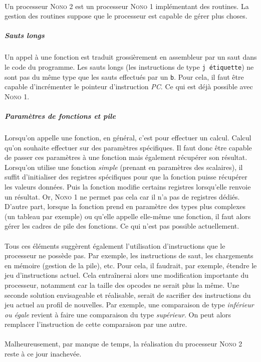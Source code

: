 \paragraph{}{
	Un processeur \textsc{Nono 2} est un processeur \textsc{Nono 1}
	implémentant des routines. La gestion des routines suppose que
	le processeur est capable de gérer plus choses.	
}

	\subparagraph{Sauts longs}{
	Un appel à une fonction est traduit grossièrement en assembleur par 
	un saut dans le code du programme.
	Les sauts longs (les instructions de type \verb|j étiquette|)
	ne sont pas du même type que les sauts effectués par un \verb|b|.
	Pour cela, il faut être capable d'incrémenter le pointeur d'instruction
	\textit{PC}. Ce qui est déjà possible avec \textsc{Nono 1}.
	}
	
	\subparagraph{Paramètres de fonctions et pile}{
	Lorsqu'on appelle une fonction, en général, c'est pour effectuer un calcul. 
	Calcul qu'on souhaite effectuer sur des paramètres spécifiques. Il faut donc
	être capable de passer ces paramètres à une fonction mais également récupérer
	son résultat. Lorsqu'on utilise une fonction 	\textit{simple} (prenant en 
	paramètres des scalaires), il suffit d'initialiser
	des registres spécifiques pour que la fonction puisse récupérer les valeurs
	données. Puis la fonction modifie certains registres lorsqu'elle renvoie un résultat.
	Or, \textsc{Nono 1} ne permet pas cela car il n'a pas de registres dédiés. \newline
	D'autre part, lorsque la fonction prend en paramètre des types plus complexes
	(un tableau par exemple) ou qu'elle appelle elle-même une fonction, il faut
	alors gérer les cadres de pile des fonctions. Ce qui n'est pas possible actuellement.
	}
	
\paragraph{}{
	Tous ces éléments suggèrent également l'utilisation d'instructions que le processeur
	ne possède pas. Par exemple, les instructions de saut, les chargements en mémoire 
	(gestion de la pile), etc. Pour cela, il faudrait, par exemple, étendre le jeu
	d'instructions actuel. Cela entraînerai alors une modification importante du 
	processeur, notamment car la taille des opcodes ne serait plus la même. \newline
	Une seconde solution envisageable et réalisable, serait de sacrifier
	des instructions du jeu actuel au profil de nouvelles. Par exemple, une comparaison
	de type \textit{inférieur ou égale} revient à faire une comparaison du type
	\textit{supérieur}. On peut alors remplacer l’instruction de 
	cette comparaison par une autre.
}

\paragraph{}{
	Malheureusement, par manque de temps, la réalisation du processeur \textsc{Nono 2}
	reste à ce jour inachevée.
}